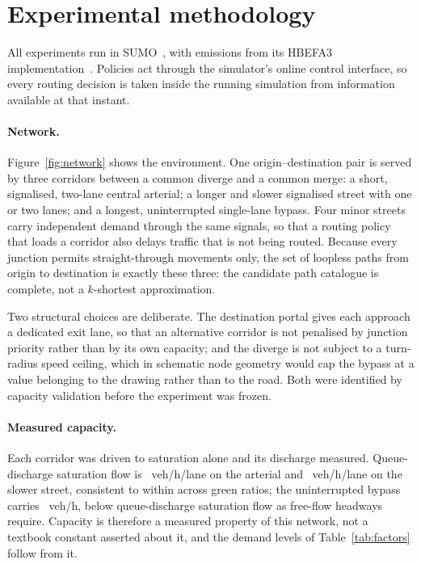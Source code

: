 \section{Experimental methodology}

All experiments run in SUMO~\cite{lopez2018sumo}, with emissions from its
HBEFA3 implementation~\cite{krajzewicz2015emissions}. Policies act through the
simulator's online control interface, so every routing decision is taken inside
the running simulation from information available at that instant.

\paragraph{Network.} Figure~\ref{fig:network} shows the environment. One
origin--destination pair is served by three corridors between a common diverge
and a common merge: a short, signalised, two-lane central arterial; a longer
and slower signalised street with one or two lanes; and a longest,
uninterrupted single-lane bypass. Four minor streets carry independent demand
through the same signals, so that a routing policy that loads a corridor also
delays traffic that is not being routed. Because every junction permits
straight-through movements only, the set of loopless paths from origin to
destination is exactly these three: the candidate path catalogue is complete,
not a $k$-shortest approximation.

Two structural choices are deliberate. The destination portal gives each
approach a dedicated exit lane, so that an alternative corridor is not
penalised by junction priority rather than by its own capacity; and the
diverge is not subject to a turn-radius speed ceiling, which in schematic node
geometry would cap the bypass at a value belonging to the drawing rather than
to the road. Both were identified by capacity validation before the experiment
was frozen.

\paragraph{Measured capacity.} Each corridor was driven to saturation alone and
its discharge measured. Queue-discharge saturation flow is
\NumSatArterial~veh/h/lane on the arterial and \NumSatNorth~veh/h/lane on the
slower street, consistent to within \NumSatSpread{} across green ratios; the
uninterrupted bypass carries \NumCapBypass~veh/h, below queue-discharge
saturation flow as free-flow headways require. Capacity is therefore a measured
property of this network, not a textbook constant asserted about it, and the
demand levels of Table~\ref{tab:factors} follow from it.


